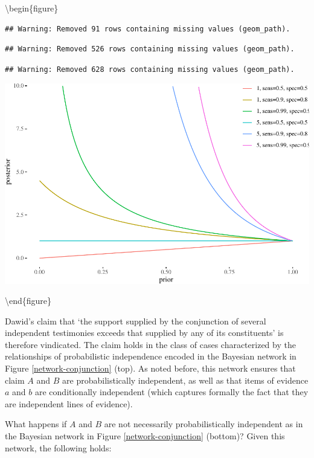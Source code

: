 \documentclass[10pt,dvipsnames,enabledeprecatedfontcommands]{scrartcl}
\begin{document}
\textbackslash{}begin\{figure\}

\begin{verbatim}
## Warning: Removed 91 rows containing missing values (geom_path).
\end{verbatim}

\begin{verbatim}
## Warning: Removed 526 rows containing missing values (geom_path).
\end{verbatim}

\begin{verbatim}
## Warning: Removed 628 rows containing missing values (geom_path).
\end{verbatim}

\begin{center}\includegraphics[width=0.9\linewidth]{conjunction-paradox_files/figure-latex/unnamed-chunk-5-1} \end{center}

\textbackslash{}end\{figure\}

Dawid's claim that `the support supplied by the conjunction of several
independent testimonies exceeds that supplied by any of its
constituents' is therefore vindicated. The claim holds in the class of
cases characterized by the relationships of probabilistic independence
encoded in the Bayesian network in Figure \ref{network-conjunction}
(top). As noted before, this network ensures that claim \(A\) and \(B\)
are probabilistically independent, as well as that items of evidence
\(a\) and \(b\) are conditionally independent (which captures formally
the fact that they are independent lines of evidence).

What happens if \(A\) and \(B\) are not necessarily probabilistically
independent as in the Bayesian network in Figure
\ref{network-conjunction} (bottom)? Given this network, the following
holds:
\end{document}
